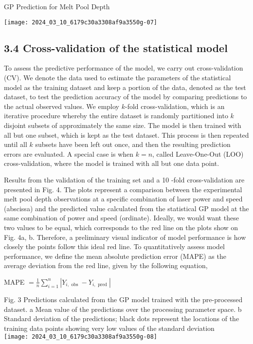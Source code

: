 \documentclass[10pt]{article}
\begin{document}
GP Prediction for Melt Pool Depth

\begin{center}
\texttt{[image: 2024\_03\_10\_6179c30a3308af9a3550g-07]}
\end{center}

\subsection*{3.4 Cross-validation of the statistical model}
To assess the predictive performance of the model, we carry out cross-validation (CV). We denote the data used to estimate the parameters of the statistical model as the training dataset and keep a portion of the data, denoted as the test dataset, to test the prediction accuracy of the model by comparing predictions to the actual observed values. We employ $k$-fold cross-validation, which is an iterative procedure whereby the entire dataset is randomly partitioned into $k$ disjoint subsets of approximately the same size. The model is then trained with all but one subset, which is kept as the test dataset. This process is then repeated until all $k$ subsets have been left out once, and then the resulting prediction errors are evaluated. A special case is when $k=n$, called Leave-One-Out (LOO) cross-validation, where the model is trained with all but one data point.

Results from the validation of the training set and a 10 -fold cross-validation are presented in Fig. 4. The plots represent a comparison between the experimental melt pool depth observations at a specific combination of laser power and speed (abscissa) and the predicted value calculated from the statistical GP model at the same combination of power and speed (ordinate). Ideally, we would want these two values to be equal, which corresponds to the red line on the plots show on Fig. 4a, b. Therefore, a preliminary visual indicator of model performance is how closely the points follow this ideal red line. To quantitatively assess model performance, we define the mean absolute prediction error (MAPE) as the average deviation from the red line, given by the following equation,

MAPE $=\frac{1}{n} \sum_{i=1}^{n}\left|Y_{i, \text { obs }}-Y_{i, \text { pred }}\right|$

Fig. 3 Predictions calculated from the GP model trained with the pre-processed dataset. a Mean value of the predictions over the processing parameter space. b Standard deviation of the predictions; black dots represent the locations of the training data points showing very low values of the standard deviation\\
\texttt{[image: 2024\_03\_10\_6179c30a3308af9a3550g-08]}
\end{document}
